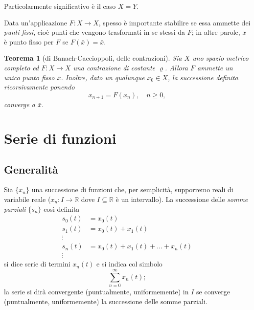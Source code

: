 \documentclass[a4paper]{book}
\numberwithin{equation}{section}
\renewcommand{\rho}{\varrho}
\theoremstyle{plain}
\newtheorem{teor}{Teorema}[section]
\theoremstyle{definition}
\theoremstyle{remark}
\theoremstyle{example}
\begin{document}
			Particolarmente significativo è il caso $X = Y$.

			Data un'applicazione $F \colon X \to X$, spesso è importante stabilire se essa ammette dei \emph{punti fissi}, cioè punti che vengono trasformati in se stessi da $F$; in altre parole, $\bar{x}$ è punto fisso per $F$ se $F(\bar{x}) = \bar{x}$.

				\begin{teor}[di Banach-Caccioppoli, delle contrazioni]
					Sia $X$ uno spazio metrico completo ed $F \colon X \to X$ una contrazione di costante $\rho$. Allora $F$ ammette un unico punto fisso $\bar{x}$. Inoltre, dato un qualunque $x_0 \in X$, la successione definita ricorsivamente ponendo
						\begin{equation}
							x_{n+1} = F(x_n), \quad n \ge 0,
						\end{equation}
					converge a $\bar{x}$.
				\end{teor}

		\section{Serie di funzioni}
		\subsection{Generalità}

		Sia $\{ x_n\}$ una successione di funzioni che, per semplicità, supporremo reali di variabile reale ($x_n \colon I \to \mathbb{R}$ dove $I \subseteq \mathbb{R}$ è un intervallo). La successione delle \emph{somme parziali} $\{s_n\}$ così definita
			\begin{align*}
				s_0(t) &= x_0(t) \\
				s_1(t) &= x_0(t) + x_1(t) \\
				\vdots \\
				s_n(t) &= x_0(t) + x_1(t) + \dots + x_n(t) \\
				\vdots
			\end{align*}
		si dice serie di termini $x_n(t)$ e si indica col simbolo
			\begin{equation*}
				\sum_{n=0}^{\infty} x_n(t);
			\end{equation*}
		la serie si dirà convergente (puntualmente, uniformemente) in $I$ se converge (puntualmente, uniformemente) la successione delle somme parziali.
\end{document}

